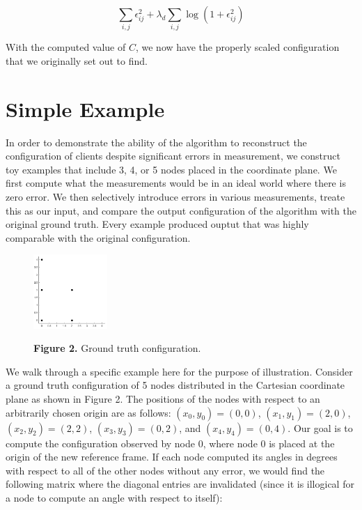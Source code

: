 \documentclass[12pt]{article}
\begin{document}
$$\sum_{i,j}{\epsilon_{ij}^2} + \lambda_d\sum_{i,j}{\log(1+ \epsilon_{ij}^2)} $$

With the computed value of $C$, we now have the properly scaled configuration that we originally set out to find. 

\section{Simple Example}

In order to demonstrate the ability of the algorithm to reconstruct the configuration of clients despite significant errors in measurement, we construct toy examples that include 3, 4, or 5 nodes placed in the coordinate plane. We first compute what the measurements would be in an ideal world where there is zero error. We then selectively introduce errors in various measurements, treate this as our input, and compare the output configuration of the algorithm with the original ground truth. Every example produced ouptut that was highly comparable with the original configuration. 

\begin{figure} %
    \centering
    \includegraphics[width=0.25\textwidth]{figure2}

\footnotesize{\textbf{Figure 2.} Ground truth configuration.}

\end{figure}

We walk through a specific example here for the purpose of illustration. Consider a ground truth configuration of 5 nodes distributed in the Cartesian coordinate plane as shown in Figure 2. The positions of the nodes with respect to an arbitrarily chosen origin are as follows: $(x_0, y_0) = (0,0)$, $(x_1, y_1) = (2,0)$, $(x_2, y_2) = (2,2)$, $(x_3, y_3) = (0,2)$, and $(x_4, y_4) = (0,4)$. Our goal is to compute the configuration observed by node 0, where node 0 is placed at the origin of the new reference frame. If each node computed its angles in degrees with respect to all of the other nodes without any error, we would find the following matrix where the diagonal entries are invalidated (since it is illogical for a node to compute an angle with respect to itself):
\end{document}
